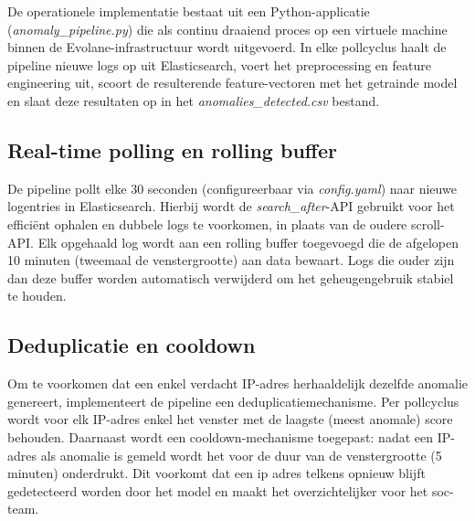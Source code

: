 De operationele implementatie bestaat uit een Python-applicatie (\textit{anomaly\_pipeline.py}) die als continu draaiend proces op een virtuele machine binnen de Evolane-infrastructuur wordt uitgevoerd. In elke pollcyclus haalt de pipeline nieuwe logs op uit Elasticsearch, voert het preprocessing en feature engineering uit, scoort de resulterende feature-vectoren met het getrainde model en slaat deze resultaten op in het \textit{anomalies\_detected.csv} bestand. 

\subsection{Real-time polling en rolling buffer} 
\label{subsec:polling-rolling-buffer}

De pipeline pollt elke 30 seconden (configureerbaar via \textit{config.yaml}) naar nieuwe logentries in Elasticsearch. Hierbij wordt de \textit{search\_after}-API gebruikt voor het efficiënt ophalen en dubbele logs te voorkomen, in plaats van de oudere scroll-API. Elk opgehaald log wordt aan een rolling buffer toegevoegd die de afgelopen 10 minuten (tweemaal de venstergrootte) aan data bewaart. Logs die ouder zijn dan deze buffer worden automatisch verwijderd om het geheugengebruik stabiel te houden.

\subsection{Deduplicatie en cooldown} 
\label{subsec:deduplicatie-cooldown}

Om te voorkomen dat een enkel verdacht IP-adres herhaaldelijk dezelfde anomalie genereert, implementeert de pipeline een deduplicatiemechanisme. Per pollcyclus wordt voor elk IP-adres enkel het venster met de laagste (meest anomale) score behouden. Daarnaast wordt een cooldown-mechanisme toegepast: nadat een IP-adres als anomalie is gemeld wordt het voor de duur van de venstergrootte (5 minuten) onderdrukt. Dit voorkomt dat een ip adres telkens opnieuw blijft gedetecteerd worden door het model en maakt het overzichtelijker voor het soc-team. 

    
    
